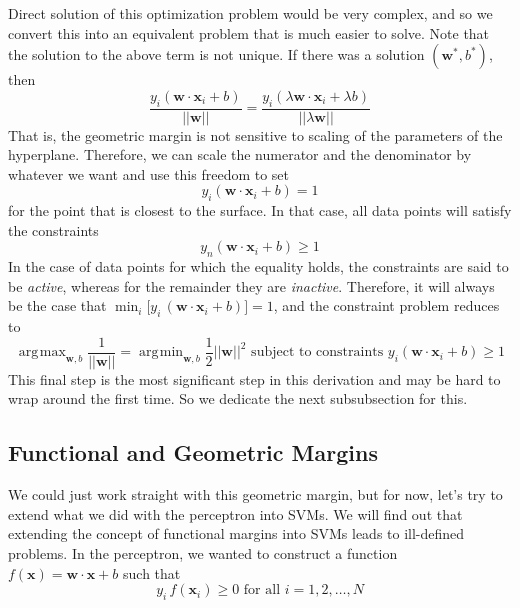 \documentclass{article}
\DeclareMathOperator*{\argmin}{\arg\!\min}
\DeclareMathOperator*{\argmax}{\arg\!\max}
\theoremstyle{definition}
\begin{document}
  Direct solution of this optimization problem would be very complex, and so we convert this into an equivalent problem that is much easier to solve. Note that the solution to the above term is not unique. If there was a solution $(\mathbf{w}^\ast, b^\ast)$, then 
  \begin{equation*}
      \frac{y_i (\mathbf{w} \cdot \mathbf{x}_i + b)}{||\mathbf{w}||} = \frac{y_i (\lambda \mathbf{w} \cdot \mathbf{x}_i + \lambda b)}{||\lambda \mathbf{w}||}  
  \end{equation*}
  That is, the geometric margin is not sensitive to scaling of the parameters of the hyperplane. Therefore, we can scale the numerator and the denominator by whatever we want and use this freedom to set 
  \begin{equation*}
      y_i ( \mathbf{w} \cdot \mathbf{x}_i + b ) = 1 
  \end{equation*}
  for the point that is closest to the surface. In that case, all data points will satisfy the constraints 
  \begin{equation*}
      y_n (\mathbf{w} \cdot \mathbf{x}_i + b) \geq 1
  \end{equation*}
  In the case of data points for which the equality holds, the constraints are said to be \textit{active}, whereas for the remainder they are \textit{inactive}. Therefore, it will always be the case that $\min_i \big[ y_i \, (\mathbf{w} \cdot \mathbf{x}_i + b)\big] = 1$, and the constraint problem reduces to 
  \begin{equation*}
      \argmax_{\mathbf{w}, b} \frac{1}{||\mathbf{w}||} = \argmin_{\mathbf{w}, b} \frac{1}{2} ||\mathbf{w}||^2 \text{ subject to constraints } y_i (\mathbf{w} \cdot \mathbf{x}_i + b) \geq 1 
  \end{equation*}
  This final step is the most significant step in this derivation and may be hard to wrap around the first time. So we dedicate the next subsubsection for this. 


  \subsection{Functional and Geometric Margins} 


  We could just work straight with this geometric margin, but for now, let's try to extend what we did with the perceptron into SVMs. We will find out that extending the concept of functional margins into SVMs leads to ill-defined problems. In the perceptron, we wanted to construct a function $f(\mathbf{x}) = \mathbf{w} \cdot \mathbf{x} + b$ such that 
  \begin{equation*}
      y_i \, f(\mathbf{x}_i) \geq 0 \text{ for all } i = 1, 2, \ldots, N
  \end{equation*}
\end{document}
